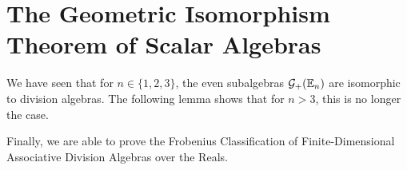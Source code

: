 

\newpage

\section{The Geometric Isomorphism Theorem of Scalar Algebras}


We have seen that for $n \in \{1, 2, 3\}$, the even subalgebras $\mathcal{G}_+(\mathbb{E}_n)$ are isomorphic to division algebras. The following lemma shows that for $n > 3$, this is no longer the case.




Finally, we are able to prove the Frobenius Classification of Finite-Dimensional Associative Division Algebras over the Reals.

%
